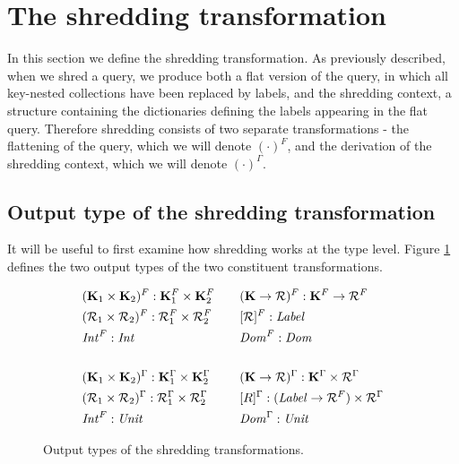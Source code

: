 {{{}

\section{The shredding transformation} {

In this section we define the shredding transformation. As previously described, when we shred a query, we produce both a flat version of the query, in which all key-nested collections have been replaced by labels, and the shredding context, a structure containing the dictionaries defining the labels appearing in the flat query. Therefore shredding consists of two separate transformations - the flattening of the query, which we will denote $(\cdot)^F$, and the derivation of the shredding context, which we will denote $(\cdot)^\Gamma$.

\subsection{Output type of the shredding transformation} {

It will be useful to first examine how shredding works at the type level. Figure \ref{shreddingtypes} defines the two output types of the two constituent transformations.

\begin{figure}
\begin{equation*}
\begin{aligned}[c]
&(\mathbf{K}_1 \times \mathbf{K}_2)^F : \mathbf{K}_1^F \times \mathbf{K}_2^F \\
&(\mathcal{R}_1 \times \mathcal{R}_2)^F : \mathcal{R}_1^F \times \mathcal{R}_2^F \\
&\textrm{\textit{Int}}^F : \textrm{\textit{Int}} \\
\\
&(\mathbf{K}_1 \times \mathbf{K}_2)^\Gamma : \mathbf{K}_1^\Gamma \times \mathbf{K}_2^\Gamma \\
&(\mathcal{R}_1 \times \mathcal{R}_2)^\Gamma : \mathcal{R}_1^\Gamma \times \mathcal{R}_2^\Gamma \\
&\textrm{\textit{Int}}^F : \textrm{\textit{Unit}} \\
\end{aligned}
\qquad
\begin{aligned}[c]
&(\mathbf{K} \rightarrow \mathcal{R})^F : \mathbf{K}^F \rightarrow \mathcal{R}^F \\
&[\mathcal{R}]^F: \textrm{\textit{Label}} \\
&\textrm{\textit{Dom}}^F : \textrm{\textit{Dom}} \\
\\
&(\mathbf{K} \rightarrow \mathcal{R})^\Gamma : \mathbf{K}^\Gamma \times \mathcal{R}^\Gamma \\
&[R]^\Gamma : (\textrm{\textit{Label}} \rightarrow \mathcal{R}^F) \times \mathcal{R}^\Gamma \\
&\textrm{\textit{Dom}}^\Gamma : \textrm{\textit{Unit}} \\
\end{aligned}
\end{equation*}
\caption{Output types of the shredding transformations.}
\label{shreddingtypes}
\end{figure}

}}}}
